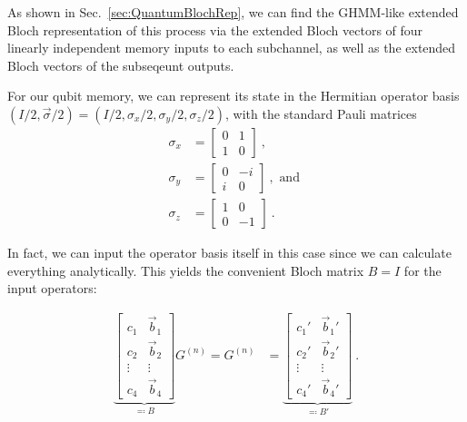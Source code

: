 \documentclass[prx,nofootinbib,onecolumn,showkeys,groupaddress,preprintnumbers,floatfix,
superscriptaddress]{revtex4-1}
\begin{document}
As shown in Sec.~\ref{sec:QuantumBlochRep},
we can find the GHMM-like extended Bloch representation of this process 
via the extended Bloch vectors of four linearly independent memory inputs to each subchannel, as well as the extended Bloch vectors of the subseqeunt outputs.

For our qubit memory, we can represent its state in the Hermitian operator basis $(I/2, \vec{\sigma}/2) = (I/2, \sigma_x/2, \sigma_y/2, \sigma_z/2)$, with the standard Pauli matrices
\begin{align}
\sigma_x &= 
\begin{bmatrix}
    0 & 1 \\
    1 & 0 
\end{bmatrix} ~, \\
% 
\sigma_y &= 
\begin{bmatrix}
    0 & -i \\
    i & 0 
\end{bmatrix} ~, \text{ and } \\
% 
\sigma_z &= 
\begin{bmatrix}
    1 & 0 \\
    0 & -1 
\end{bmatrix} ~.
\end{align}

In fact, we can input the operator basis itself in this case since we can calculate everything analytically. 
This yields the convenient Bloch matrix $B = I$ for the input operators:


\begin{align}
	\underbrace{
	\begin{bmatrix}
		c_1 & \vec{b}_1 \\
		c_2 & \vec{b}_2 \\
		\vdots & \vdots \\
		c_4 & \vec{b}_{4} 
	\end{bmatrix}	
}_{\eqqcolon B}
G^{(n)}
=
G^{(n)}
&= 
	\underbrace{
	\begin{bmatrix}
		c_1' & \vec{b}_1' \\
		c_2' & \vec{b}_2' \\
		\vdots & \vdots \\
		c_{4}' & \vec{b}_{4}' 
	\end{bmatrix}	
}_{\eqqcolon B'}
 ~.
 \label{eq:TomProcessBlochMatrices}
\end{align}	
\end{document}
